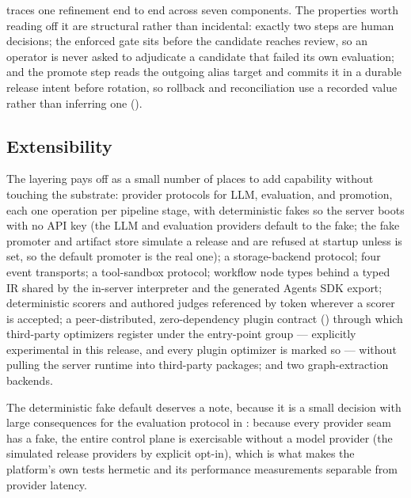 

  traces one refinement end to end
across seven components. The properties worth reading off it are structural rather
than incidental: exactly two steps are human decisions; the enforced gate sits
before the candidate reaches review, so an operator is never asked to adjudicate a
candidate that failed its own evaluation; and the promote step reads the outgoing
alias target and commits it in a durable release intent before rotation, so rollback
and reconciliation use a recorded value rather than inferring one
().



\subsection{Extensibility}

The layering pays off as a small number of places to add capability without
touching the substrate: provider protocols for LLM, evaluation, and promotion, each
one operation per pipeline stage, with deterministic fakes so the server boots with
no API key (the LLM and evaluation providers default to the fake; the fake promoter
and artifact store simulate a release and are refused at startup unless
 is set, so the default promoter is the
real \mlflow{} one); a storage-backend protocol; four event transports; a
tool-sandbox protocol; \statNodeTypes{} workflow node types behind a typed IR
shared by the in-server interpreter and the generated Agents SDK export;
deterministic scorers and authored judges referenced by token wherever a scorer is
accepted; a peer-distributed, zero-dependency plugin contract
() through which third-party optimizers register under the
 entry-point group --- explicitly experimental in this
release, and every plugin optimizer is marked so --- without pulling the server
runtime into third-party packages; and two
graph-extraction backends.

The deterministic fake default deserves a note, because it is a small decision with
large consequences for the evaluation protocol in : because
every provider seam has a fake, the entire control plane is exercisable without a
model provider (the simulated release providers by explicit opt-in), which is what makes the platform's own tests hermetic and its
performance measurements separable from provider latency.

